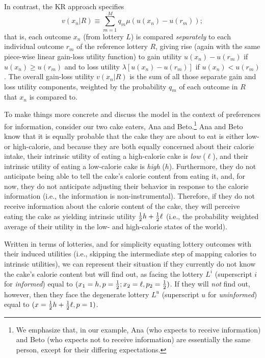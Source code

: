 In contrast, the KR approach specifies
\begin{equation*}
  v(x_n|R) \equiv \sum_{m=1}^M q_m \mu (u(x_n)-u(r_m));
\end{equation*}
that is, each outcome $x_n$ (from lottery $L$) is compared \emph{separately} to each individual outcome $r_m$ of the reference lottery $R$, giving rise (again with the same piece-wise linear gain-loss utility function) to gain utility $u(x_n)-u(r_m)$ if $u(x_n) \geq u(r_m)$ and to loss utility $\lambda [u(x_n)-u(r_m)]$ if $u(x_n)<u(r_m)$. The overall gain-loss utility $v(x_n|R)$ is the sum of all those separate gain and loss utility components, weighted by the probability $q_m$ of each outcome in $R$ that $x_n$ is compared to.

To make things more concrete and discuss the model in the context of preferences for information, consider our two cake eaters, Ana and Beto.\footnote{We emphasize that, in our example, Ana (who expects to receive information) and Beto (who expects not to receive information) are essentially the same person, except for their differing expectations.} Ana and Beto know that it is equally probable that the cake they are about to eat is either low- or high-calorie, and because they are both equally concerned about their calorie intake, their intrinsic utility of eating a high-calorie cake is \emph{low} ($\ell$), and their intrinsic utility of eating a low-calorie cake is \emph{high} ($h$). Furthermore, they do not anticipate being able to tell the cake’s calorie content from eating it, and, for now, they do not anticipate adjusting their behavior in response to the calorie information (i.e., the information is non-instrumental). Therefore, if they do not receive information about the calorie content of the cake, they will perceive eating the cake as yielding intrinsic utility $\tfrac{1}{2} h + \tfrac{1}{2} \ell$ (i.e., the probability weighted average of their utility in the low- and high-calorie states of the world).

Written in terms of lotteries, and for simplicity equating lottery outcomes with their induced utilities (i.e., skipping the intermediate step of mapping calories to intrinsic utilities), we can represent their situation if they currently do not know the cake's calorie content but will find out, as facing the lottery $L^i$ (superscript $i$ for \emph{informed}) equal to $(x_1=h,p=\tfrac{1}{2};x_2=\ell,p_2=\tfrac{1}{2})$. If they will \emph{not} find out, however, then they face the degenerate lottery $L^u$ (superscript $u$ for \emph{uninformed}) equal to $(x=\tfrac{1}{2} h + \tfrac{1}{2} \ell,p=1)$.


